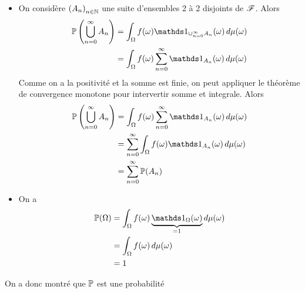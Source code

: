{\begin{td-sol}[]
\begin{enumerate}
\begin{itemize}[label=\(\triangleright\)]
                \item On considère \({(A_n)}_{n\in\mathbb{N}}\) une suite d'ensembles 2 à 2 disjoints de \(\mathscr{F}\). Alors
                \begin{equation*}
                    \begin{aligned}
                        \bb P\left(\bigcup_{n=0}^\infty A_n\right)
                        &= \int_{\Omega}f(\omega) \one_{\cup_{n=0}^\infty A_n}(\omega)\der\mu(\omega)\\
                        &= \int_{\Omega}f(\omega)\sum_{n=0}^\infty \one_{A_n}(\omega)\der\mu(\omega)
                    \end{aligned}
                \end{equation*}
                Comme on a la positivité et la somme est finie, on peut appliquer le théorème
                de convergence monotone pour intervertir somme et integrale. Alors
                \begin{equation*}
                    \begin{aligned}
                        \bb P\left(\bigcup_{n=0}^\infty A_n\right)
                        &= \int_{\Omega}f(\omega)\sum_{n=0}^\infty \one_{A_n}(\omega)\der\mu(\omega)\\
                        &= \sum_{n=0}^{\infty} \int_{\Omega} f(\omega)\one_{A_n}(\omega)\der\mu(\omega)\\
                        &= \sum_{n=0}^{\infty} \bb P(A_n)
                    \end{aligned}
                \end{equation*}

                \item On a
                \begin{equation*}
                    \begin{aligned}
                        \bb P(\Omega)
                        &= \int_{\Omega} f(\omega)\underbrace{\one_{\Omega}(\omega)}_{=1}\der\mu(\omega)\\
                        &= \int_{\Omega} f(\omega)\der\mu(\omega)\\
                        &= 1
                    \end{aligned}
                \end{equation*}
            \end{itemize}

            On a donc montré que \(\mathbb{P}\) est une probabilité
        \end{enumerate}
    \end{td-sol}
}{}

